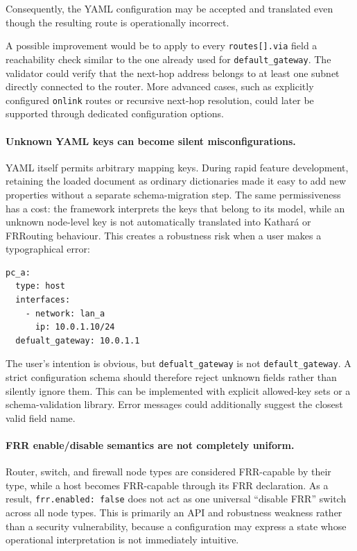 Consequently, the YAML configuration may be accepted and translated even though the resulting route is operationally incorrect.

A possible improvement would be to apply to every \texttt{routes[].via} field a reachability check similar to the one already used for \texttt{default\_gateway}. The validator could verify that the next-hop address belongs to at least one subnet directly connected to the router. More advanced cases, such as explicitly configured \texttt{onlink} routes or recursive next-hop resolution, could later be supported through dedicated configuration options.

\paragraph{Unknown YAML keys can become silent misconfigurations.}
YAML itself permits arbitrary mapping keys. During rapid feature development,
retaining the loaded document as ordinary dictionaries made it easy to add new
properties without a separate schema-migration step. The same permissiveness
has a cost: the framework interprets the keys that belong to its model, while
an unknown node-level key is not automatically translated into Kathar\'a or
FRRouting behaviour. This creates a robustness risk when a user makes a
typographical error:

\begin{lstlisting}[caption={Typographical error that resembles a valid configuration field.},
label={lst:unknown-key-example}]
pc_a:
  type: host
  interfaces:
    - network: lan_a
      ip: 10.0.1.10/24
  defualt_gateway: 10.0.1.1
\end{lstlisting}

The user's intention is obvious, but \texttt{defualt\_gateway} is not
\texttt{default\_gateway}. A strict configuration schema should therefore
reject unknown fields rather than silently ignore them. This can be
implemented with explicit allowed-key sets or a schema-validation library.
Error messages could additionally suggest the closest valid field name.

\paragraph{FRR enable/disable semantics are not completely uniform.}
Router, switch, and firewall node types are considered FRR-capable by their
type, while a host becomes FRR-capable through its FRR declaration. As a
result, \texttt{frr.enabled: false} does not act as one universal
``disable FRR'' switch across all node types. This is primarily an API and
robustness weakness rather than a security vulnerability, because a
configuration may express a state whose operational interpretation is not
immediately intuitive.

